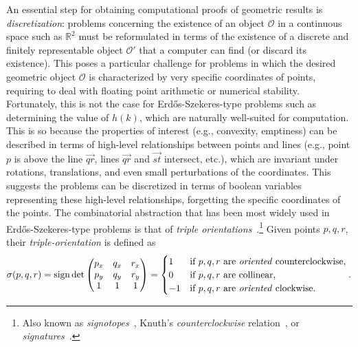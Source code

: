 An essential step for obtaining computational proofs of geometric results is \emph{discretization}: problems concerning the existence of an object $\mathcal{O}$ in a continuous space such as $\mathbb{R}^2$ must be reformulated in terms of the existence of a discrete and finitely representable object $\mathcal{O}'$ that a computer can find (or discard its existence). 
This poses a particular challenge for problems in which the desired geometric object $\mathcal{O}$ is characterized by very specific coordinates of points, requiring to deal with floating point arithmetic or numerical stability.  
Fortunately, this is not the case for Erd\H{o}s-Szekeres-type problems such as determining the value of $h(k)$, which are naturally well-suited for computation. 
This is so because the properties of interest (e.g., convexity, emptiness) can be described in terms of high-level relationships between points and lines (e.g., point $p$ is above the line $\vec{qr}$, lines $\vec{qr}$ and $\vec{st}$ intersect, etc.), which are invariant under rotations, translations, and even small perturbations of the coordinates. This suggests the problems can be discretized in terms of boolean variables representing these high-level relationships, forgetting the specific coordinates of the points.  
The combinatorial abstraction that has been most widely used in Erd\H{o}s-Szekeres-type problems is that of \emph{triple orientations}~\cite{ emptyHexagonNumber, scheucherTwoDisjoint5holes2020}.\footnote{Also known as \emph{signotopes}~\cite{felsnerSweepsArrangementsSignotopes2001, subercaseaux2023minimizing},  Knuth's \emph{counterclockwise} relation~\cite{knuthAxiomsHulls1992}, or \emph{signatures}~\cite{szekeres_peters_2006}.}
Given points $p, q, r$, their \emph{triple-orientation} is defined as 
\newcommand{\sign}{\operatorname{sign}}
\[
  \sigma(p, q, r) = \sign \det \begin{pmatrix} p_x & q_x & r_x \\ p_y & q_y & r_y \\ 1 & 1 & 1 \end{pmatrix} = \begin{cases}
    1 & \text{if } p, q, r \text{ are \emph{oriented} counterclockwise}, \\
    0 & \text{if } p, q, r \text{ are collinear}, \\
    -1 & \text{if } p, q, r \text{ are \emph{oriented} clockwise}.
  \end{cases}.
\]

